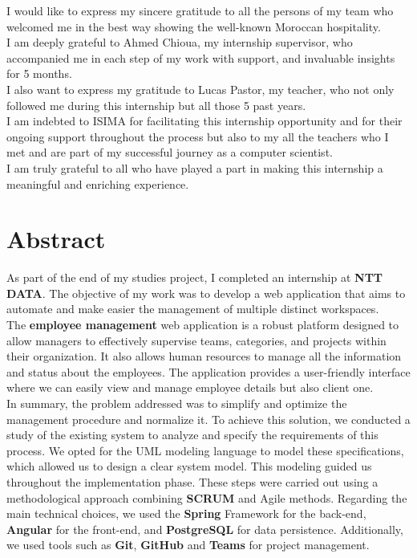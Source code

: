 \documentclass[12pt,a4paper,table,english]{article}
\begin{document}
	I would like to express my sincere gratitude to all the persons of my team who welcomed me in the best way showing the well-known Moroccan hospitality.\\
	
	I am deeply grateful to Ahmed Chioua, my internship supervisor, who accompanied me in each step of my work with support, and invaluable insights for 5 months.\\
	
	I also want to express my gratitude to Lucas Pastor, my teacher, who not only followed me during this internship but all those 5 past years.\\
		
	I am indebted to ISIMA for facilitating this internship opportunity and for their ongoing support throughout the process but also to my all the teachers who I met and are part of my successful journey as a computer scientist.\\
			
	I am truly grateful to all who have played a part in making this internship a meaningful and enriching experience.\\
	
	\pagebreak
	
	\listoffigures
	\pagebreak
	
	\listoftables
	\pagebreak

	\section{Abstract}
	
	As part of the end of my studies project, I completed an internship at \textbf{NTT DATA}. The objective of my work was to develop a web application that aims to automate and make easier the management of multiple distinct workspaces.\\
	
	The \textbf{employee management} web application is a robust platform designed to allow managers to effectively supervise teams, categories, and projects within their organization. It also allows human resources to manage all the information and status about the employees. The application provides a user-friendly interface where we can easily view and manage employee details but also client one.\\
	
	In summary, the problem addressed was to simplify and optimize the management
	procedure and normalize it.	To achieve this solution, we conducted a study of the existing system to analyze and specify the requirements of this process. We opted for the UML modeling language to model these specifications, which allowed us to design a clear system model. This modeling guided us throughout the implementation phase. These steps
	were carried out using a methodological approach combining \textbf{SCRUM} and Agile methods. Regarding the main technical choices, we used the \textbf{Spring} Framework for the back-end, \textbf{Angular} for the front-end, and \textbf{PostgreSQL} for data persistence.
	Additionally, we used tools such as \textbf{Git}, \textbf{GitHub} and \textbf{Teams} for project management.\\
	
\end{document}
